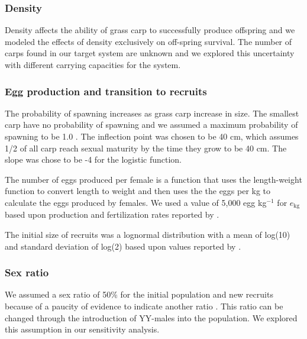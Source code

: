 \documentclass{article}[12pt]
\begin{document}
\subsubsection{Density}

Density affects the ability of grass carp to successfully produce offspring \citep{kilambi1979effects, shelton1981density} and we modeled the effects of density exclusively on off-spring survival. 
The number of carps found in our target system are unknown and we explored this uncertainty with different carrying capacities for the system. 

\subsubsection{Egg production and transition to recruits}

The probability of spawning increases as grass carp increase in size.
The smallest carp have no probability of spawning and we assumed a maximum probability of spawning to be 1.0 \citep{shireman1983synopsis}.
The inflection point was chosen to be 40 cm, which assumes 1/2 of all carp reach sexual maturity by the time they grow to be 40 cm. 
The slope was chose to be -4 for the logistic function. 

The number of eggs produced per female is a function that uses the length-weight function to convert length to weight and then uses the the eggs per kg to calculate the eggs produced by females. 
We used a value of 5,000 egg kg\(^{-1}\) for \(e_\text{kg}\) based upon production and fertilization rates reported by \citet{ashraf1998effects}.

The initial size of recruits was a lognormal distribution with a mean of log(10) and standard deviation of log(2) based upon values reported by \citet{shireman1983synopsis}. 

\subsubsection{Sex ratio}

We assumed a sex ratio of 50\% for the initial population and new recruits because of a paucity of evidence to indicate another ratio \citep{shireman1983synopsis}.
This ratio can be changed through the introduction of YY-males into the population. 
We explored this assumption in our sensitivity analysis. 

%
\end{document}
